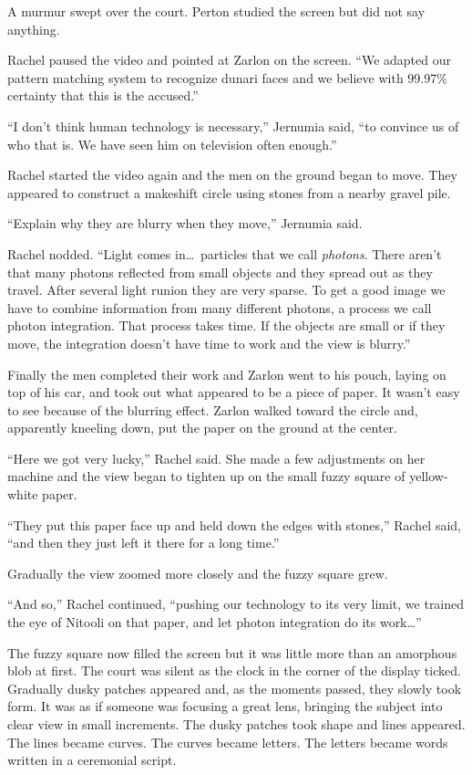 A murmur swept over the court. Perton studied the screen but did not say anything.

Rachel paused the video and pointed at Zarlon on the screen. ``We adapted our pattern matching
system to recognize dunari faces and we believe with 99.97\% certainty that this is the
accused.''

``I don't think human technology is necessary,'' Jernumia said, ``to convince us of who that
is. We have seen him on television often enough.''

Rachel started the video again and the men on the ground began to move. They appeared to
construct a makeshift circle using stones from a nearby gravel pile.

``Explain why they are blurry when they move,'' Jernumia said.

Rachel nodded. ``Light comes in\ldots\ particles that we call \textit{photons}. There aren't
that many photons reflected from small objects and they spread out as they travel. After several
light runion they are very sparse. To get a good image we have to combine information from many
different photons, a process we call photon integration. That process takes time. If the objects
are small or if they move, the integration doesn't have time to work and the view is blurry.''

Finally the men completed their work and Zarlon went to his pouch, laying on top of his car, and
took out what appeared to be a piece of paper. It wasn't easy to see because of the blurring
effect. Zarlon walked toward the circle and, apparently kneeling down, put the paper on the
ground at the center.

``Here we got very lucky,'' Rachel said. She made a few adjustments on her machine and the view
began to tighten up on the small fuzzy square of yellow-white paper.

``They put this paper face up and held down the edges with stones,'' Rachel said, ``and then
they just left it there for a long time.''

Gradually the view zoomed more closely and the fuzzy square grew.

``And so,'' Rachel continued, ``pushing our technology to its very limit, we trained the eye of
Nitooli on that paper, and let photon integration do its work\ldots''

The fuzzy square now filled the screen but it was little more than an amorphous blob at first.
The court was silent as the clock in the corner of the display ticked. Gradually dusky patches
appeared and, as the moments passed, they slowly took form. It was as if someone was focusing a
great lens, bringing the subject into clear view in small increments. The dusky patches took
shape and lines appeared. The lines became curves. The curves became letters. The letters became
words written in a ceremonial script.

